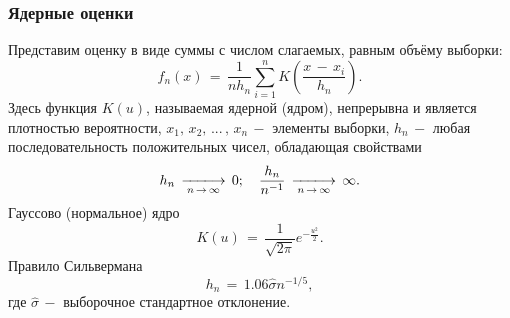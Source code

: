 \subsubsection{Ядерные оценки}
\begin{flushleft}
	Представим оценку в виде суммы с числом слагаемых, равным объёму выборки:
	\begin{equation}
		\label{23} \hat{f}_n(x)\,=\,\frac{1}{nh_n}\displaystyle\sum_{i=1}^{n} K\left(\frac{x \,-\, x_i}{h_n}\right).
	\end{equation}
	Здесь функция $K(u)$, называемая ядерной (ядром), непрерывна и является плотностью вероятности, $x_1,\, x_2,\,...\,,\, x_n \,-$ элементы выборки, ${h_n}\,-$ любая последовательность положительных чисел, обладающая свойствами
	\begin{equation}
		\label{24} h_n \,\xlongrightarrow[n \,\rightarrow\,\infty]{}\,0;\quad \frac{h_n}{n^{-1}}\,\xlongrightarrow[n \,\rightarrow\,\infty]{}\,\infty.
	\end{equation}
	Гауссово (нормальное) ядро \cite[с.38]{4}
	\begin{equation}
		\label{25} K(u)\,=\,\frac{1}{\sqrt{2\pi}}e^{-\frac{u^2}{2}}.
	\end{equation}
	Правило Сильвермана \cite[с.44]{4}
	\begin{equation}
		\label{26} h_n \,=\,1.06\hat{\sigma}n^{-1/5},
	\end{equation}
	где $\hat{\sigma}\,-$ выборочное стандартное отклонение.
\end{flushleft}